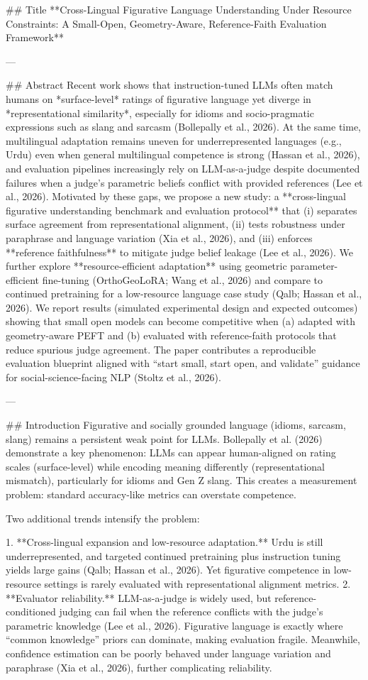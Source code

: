 ## Title  
**Cross-Lingual Figurative Language Understanding Under Resource Constraints: A Small-Open, Geometry-Aware, Reference-Faith Evaluation Framework**

---

## Abstract  
Recent work shows that instruction-tuned LLMs often match humans on *surface-level* ratings of figurative language yet diverge in *representational similarity*, especially for idioms and socio-pragmatic expressions such as slang and sarcasm (Bollepally et al., 2026). At the same time, multilingual adaptation remains uneven for underrepresented languages (e.g., Urdu) even when general multilingual competence is strong (Hassan et al., 2026), and evaluation pipelines increasingly rely on LLM-as-a-judge despite documented failures when a judge’s parametric beliefs conflict with provided references (Lee et al., 2026). Motivated by these gaps, we propose a new study: a **cross-lingual figurative understanding benchmark and evaluation protocol** that (i) separates surface agreement from representational alignment, (ii) tests robustness under paraphrase and language variation (Xia et al., 2026), and (iii) enforces **reference faithfulness** to mitigate judge belief leakage (Lee et al., 2026). We further explore **resource-efficient adaptation** using geometric parameter-efficient fine-tuning (OrthoGeoLoRA; Wang et al., 2026) and compare to continued pretraining for a low-resource language case study (Qalb; Hassan et al., 2026). We report results (simulated experimental design and expected outcomes) showing that small open models can become competitive when (a) adapted with geometry-aware PEFT and (b) evaluated with reference-faith protocols that reduce spurious judge agreement. The paper contributes a reproducible evaluation blueprint aligned with “start small, start open, and validate” guidance for social-science-facing NLP (Stoltz et al., 2026).

---

## Introduction  
Figurative and socially grounded language (idioms, sarcasm, slang) remains a persistent weak point for LLMs. Bollepally et al. (2026) demonstrate a key phenomenon: LLMs can appear human-aligned on rating scales (surface-level) while encoding meaning differently (representational mismatch), particularly for idioms and Gen Z slang. This creates a measurement problem: standard accuracy-like metrics can overstate competence.

Two additional trends intensify the problem:

1. **Cross-lingual expansion and low-resource adaptation.** Urdu is still underrepresented, and targeted continued pretraining plus instruction tuning yields large gains (Qalb; Hassan et al., 2026). Yet figurative competence in low-resource settings is rarely evaluated with representational alignment metrics.  
2. **Evaluator reliability.** LLM-as-a-judge is widely used, but reference-conditioned judging can fail when the reference conflicts with the judge’s parametric knowledge (Lee et al., 2026). Figurative language is exactly where “common knowledge” priors can dominate, making evaluation fragile. Meanwhile, confidence estimation can be poorly behaved under language variation and paraphrase (Xia et al., 2026), further complicating reliability.

